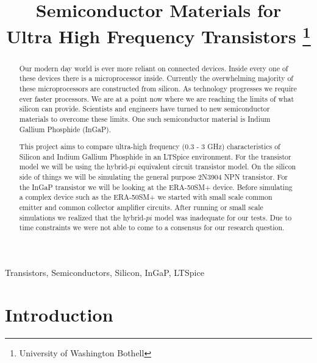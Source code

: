 \documentclass[conference]{IEEEtran}
\begin{document}
\title{Semiconductor Materials for\\Ultra High Frequency Transistors
    \thanks{University of Washington Bothell}
}

\author{
}

\maketitle

\begin{abstract}
    Our modern day world is ever more reliant on connected devices. Inside every one of these devices there is a microprocessor
    inside. Currently the overwhelming majority of these microprocessors are constructed from silicon. As technology progresses
    we require ever faster processors. We are at a point now where we are reaching the limits of what silicon can provide. Scientists
    and engineers have turned to new semiconductor materials to overcome these limits. One such semiconductor material is Indium
    Gallium Phosphide (InGaP).

    This project aims to compare ultra-high frequency (0.3 - 3 GHz) characteristics of Silicon and Indium Gallium Phosphide in an
    LTSpice environment. For the transistor model we will be using the hybrid-$pi$ equivalent circuit transistor model.
    On the silicon side of things we will be simulating the general purpose 2N3904 NPN transistor. For the
    InGaP transistor we will be looking at the ERA-50SM+ device. Before simulating a complex device such as the ERA-50SM+ we started
    with small scale common emitter and common collector amplifier circuits. After running or small scale simulations we realized
    that the hybrid-$pi$ model was inadequate for our tests. Due to time constraints we were not able to come to a consensus
    for our research question.
\end{abstract}

\begin{IEEEkeywords}
    Transistors, Semiconductors, Silicon, InGaP, LTSpice
\end{IEEEkeywords}

\section{Introduction}
\end{document}
